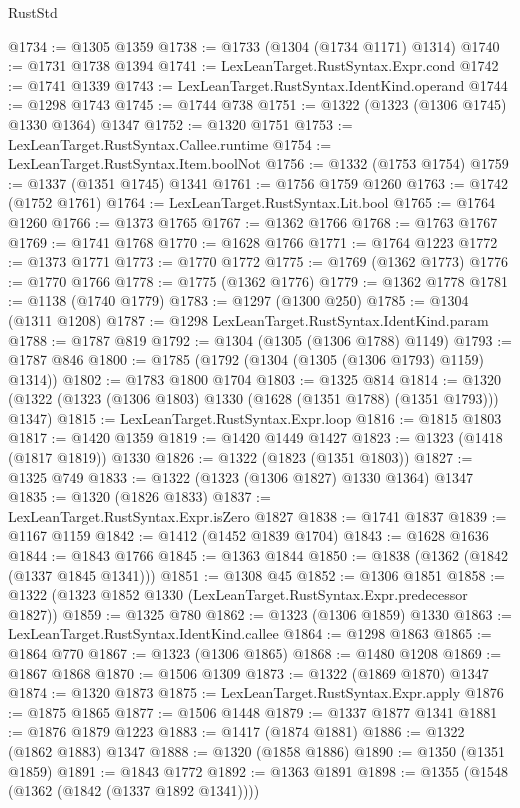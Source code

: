\begin{lexlean}{RustStd}
\begin{coremodule}
@1734 := @1305 @1359
@1738 := @1733 (@1304 (@1734 @1171) @1314)
@1740 := @1731 @1738 @1394
@1741 := LexLeanTarget.RustSyntax.Expr.cond
@1742 := @1741 @1339
@1743 := LexLeanTarget.RustSyntax.IdentKind.operand
@1744 := @1298 @1743
@1745 := @1744 @738
@1751 := @1322 (@1323 (@1306 @1745) @1330 @1364) @1347
@1752 := @1320 @1751
@1753 := LexLeanTarget.RustSyntax.Callee.runtime
@1754 := LexLeanTarget.RustSyntax.Item.boolNot
@1756 := @1332 (@1753 @1754)
@1759 := @1337 (@1351 @1745) @1341
@1761 := @1756 @1759 @1260
@1763 := @1742 (@1752 @1761)
@1764 := LexLeanTarget.RustSyntax.Lit.bool
@1765 := @1764 @1260
@1766 := @1373 @1765
@1767 := @1362 @1766
@1768 := @1763 @1767
@1769 := @1741 @1768
@1770 := @1628 @1766
@1771 := @1764 @1223
@1772 := @1373 @1771
@1773 := @1770 @1772
@1775 := @1769 (@1362 @1773)
@1776 := @1770 @1766
@1778 := @1775 (@1362 @1776)
@1779 := @1362 @1778
@1781 := @1138 (@1740 @1779)
@1783 := @1297 (@1300 @250)
@1785 := @1304 (@1311 @1208)
@1787 := @1298 LexLeanTarget.RustSyntax.IdentKind.param
@1788 := @1787 @819
@1792 := @1304 (@1305 (@1306 @1788) @1149)
@1793 := @1787 @846
@1800 := @1785 (@1792 (@1304 (@1305 (@1306 @1793) @1159) @1314))
@1802 := @1783 @1800 @1704
@1803 := @1325 @814
@1814 := @1320 (@1322 (@1323 (@1306 @1803) @1330 (@1628 (@1351 @1788) (@1351 @1793))) @1347)
@1815 := LexLeanTarget.RustSyntax.Expr.loop
@1816 := @1815 @1803
@1817 := @1420 @1359
@1819 := @1420 @1449 @1427
@1823 := @1323 (@1418 (@1817 @1819)) @1330
@1826 := @1322 (@1823 (@1351 @1803))
@1827 := @1325 @749
@1833 := @1322 (@1323 (@1306 @1827) @1330 @1364) @1347
@1835 := @1320 (@1826 @1833)
@1837 := LexLeanTarget.RustSyntax.Expr.isZero @1827
@1838 := @1741 @1837
@1839 := @1167 @1159
@1842 := @1412 (@1452 @1839 @1704)
@1843 := @1628 @1636
@1844 := @1843 @1766
@1845 := @1363 @1844
@1850 := @1838 (@1362 (@1842 (@1337 @1845 @1341)))
@1851 := @1308 @45
@1852 := @1306 @1851
@1858 := @1322 (@1323 @1852 @1330 (LexLeanTarget.RustSyntax.Expr.predecessor @1827))
@1859 := @1325 @780
@1862 := @1323 (@1306 @1859) @1330
@1863 := LexLeanTarget.RustSyntax.IdentKind.callee
@1864 := @1298 @1863
@1865 := @1864 @770
@1867 := @1323 (@1306 @1865)
@1868 := @1480 @1208
@1869 := @1867 @1868
@1870 := @1506 @1309
@1873 := @1322 (@1869 @1870) @1347
@1874 := @1320 @1873
@1875 := LexLeanTarget.RustSyntax.Expr.apply
@1876 := @1875 @1865
@1877 := @1506 @1448
@1879 := @1337 @1877 @1341
@1881 := @1876 @1879 @1223
@1883 := @1417 (@1874 @1881)
@1886 := @1322 (@1862 @1883) @1347
@1888 := @1320 (@1858 @1886)
@1890 := @1350 (@1351 @1859)
@1891 := @1843 @1772
@1892 := @1363 @1891
@1898 := @1355 (@1548 (@1362 (@1842 (@1337 @1892 @1341))))

\end{coremodule}
\end{lexlean}
